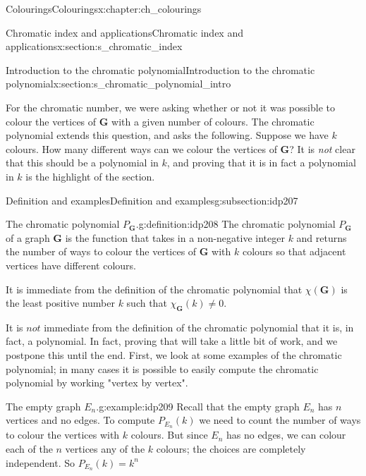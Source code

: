 \documentclass[oneside,10pt,]{book}
\numberwithin{equation}{section}
\newcommand{\bfG}{\mathbf{G}}
\begin{document}
\begin{chapterptx}{Colourings}{}{Colourings}{}{}{x:chapter:ch_colourings}
\begin{sectionptx}{Chromatic index and applications}{}{Chromatic index and applications}{}{}{x:section:s_chromatic_index}
\end{sectionptx}
%
%
\typeout{************************************************}
\typeout{************************************************}
%
\begin{sectionptx}{Introduction to the chromatic polynomial}{}{Introduction to the chromatic polynomial}{}{}{x:section:s_chromatic_polynomial_intro}
\begin{introduction}{}%
For the chromatic number, we were asking whether or not it was possible to colour the vertices of \(\bfG\) with a given number of colours.  The chromatic polynomial extends this question, and asks the following.  Suppose we have \(k\) colours.  How many different ways can we colour the vertices of \(\bfG\)?  It is \emph{not} clear that this should be a polynomial in \(k\), and proving that it is in fact a polynomial in \(k\) is the highlight of the section.%
\end{introduction}%
%
%
\typeout{************************************************}
\typeout{************************************************}
%
\begin{subsectionptx}{Definition and examples}{}{Definition and examples}{}{}{g:subsection:idp207}
\begin{definition}{The chromatic polynomial \(P_{\bfG}\).}{g:definition:idp208}%
The chromatic polynomial \(P_{\bfG}\) of a graph \(\bfG\) is the function that takes in a non-negative integer \(k\) and returns the number of ways to colour the vertices of \(\bfG\) with \(k\) colours so that adjacent vertices have different colours.%
\end{definition}
It is immediate from the definition of the chromatic polynomial that \(\chi(\bfG)\) is the least positive number \(k\) such that \(\chi_{\bfG}(k)\neq 0\).%
\par
It is \(not\) immediate from the definition of the chromatic polynomial that it is, in fact, a polynomial.  In fact, proving that will take a little bit of work, and we postpone this until the end.  First, we look at some examples of the chromatic polynomial; in many cases it is possible to easily compute the chromatic polynomial by working "vertex by vertex".%
\begin{example}{The empty graph \(E_n\).}{g:example:idp209}%
Recall that the empty graph \(E_n\) has \(n\) vertices and no edges.  To compute \(P_{E_n}(k)\) we need to count the number of ways to colour the vertices with \(k\) colours.  But since \(E_n\) has no edges, we can colour each of the \(n\) vertices any of the \(k\) colours; the choices are completely independent.  So \(P_{E_n}(k)=k^n\)%

\end{example}
\end{subsectionptx}
\end{sectionptx}
\end{chapterptx}
\end{document}
